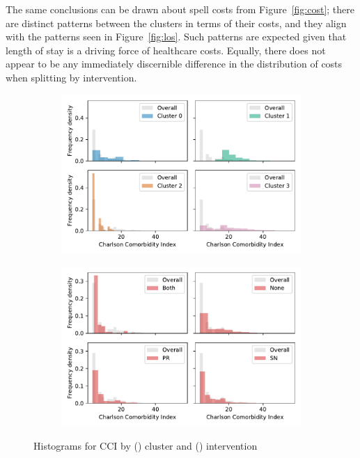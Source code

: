 The same conclusions can be drawn about spell costs from Figure~\ref{fig:cost};
there are distinct patterns between the clusters in terms of their costs, and
they align with the patterns seen in Figure~\ref{fig:los}. Such patterns are
expected given that length of stay is a driving force of healthcare costs.
Equally, there does not appear to be any immediately discernible difference in
the distribution of costs when splitting by intervention.

\begin{figure}
    \centering
    \begin{subfigure}{\imgwidth}
        \includegraphics[width=\linewidth]{cluster_charlson_gross}
        \caption{}\label{fig:cluster_charlson}
    \end{subfigure}

    \begin{subfigure}{\imgwidth}
        \includegraphics[width=\linewidth]{intervention_charlson_gross}
        \caption{}\label{fig:intervention_charlson}
    \end{subfigure}
    \caption{%
        Histograms for CCI by () cluster and
        () intervention
    }\label{fig:charlson}
\end{figure}


